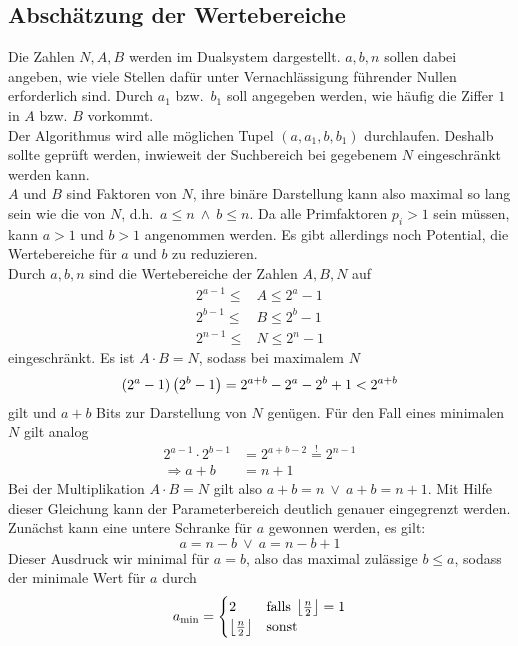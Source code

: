\subsection{Abschätzung der Wertebereiche}\label{sec:parameterspace}
Die Zahlen $N,A,B$ werden im Dualsystem dargestellt. $a,b,n$ sollen dabei angeben, wie viele Stellen dafür unter Vernachlässigung führender Nullen erforderlich sind. Durch $a_1$ bzw.\ $b_1$ soll angegeben werden, wie häufig die Ziffer $1$ in $A$ bzw. $B$ vorkommt. \\
Der Algorithmus wird alle möglichen Tupel $\left(a,a_1,b,b_1\right)$ durchlaufen. Deshalb sollte geprüft werden, inwieweit der Suchbereich bei gegebenem $N$ eingeschränkt werden kann. \\
$A$ und $B$ sind Faktoren von $N$, ihre binäre Darstellung kann also maximal so lang sein wie die von $N$, d.h.\ $a\leq n\:\wedge\: b\leq n$. Da alle Primfaktoren $p_i > 1$ sein müssen, kann $a>1$ und $b>1$ angenommen werden. Es gibt allerdings noch Potential, die Wertebereiche für $a$ und $b$ zu reduzieren. \\
Durch $a,b,n$ sind die Wertebereiche der Zahlen $A,B,N$ auf
\begin{align*}
		2^{a-1}\leq &A \leq 2^a-1 \\
		2^{b-1}\leq &B \leq 2^b-1 \\
		2^{n-1}\leq &N \leq 2^n-1
\end{align*}
eingeschränkt. Es ist $A\cdot B=N$, sodass bei maximalem $N$
\begin{equation*}
		\left(2^a-1\right)\left(2^b-1\right)=2^{a+b}-2^a-2^b+1<2^{a+b} \\
\end{equation*}
gilt und $a+b$ Bits zur Darstellung von $N$ genügen. Für den Fall eines minimalen $N$ gilt analog
\begin{align*}
		2^{a-1}\cdot 2^{b-1}&=2^{a+b-2}\overset{!}{=}2^{n-1} \\
		\Rightarrow a+b&=n+1
\end{align*}
Bei der Multiplikation $A\cdot B =N$ gilt also $a+b=n\:\vee\:a+b=n+1$. Mit Hilfe dieser Gleichung kann der Parameterbereich deutlich genauer eingegrenzt werden. \\
Zunächst kann eine untere Schranke für $a$ gewonnen werden, es gilt:
\begin{equation*}
		a=n-b \:\vee\: a=n-b+1
\end{equation*}
Dieser Ausdruck wir minimal für $a=b$, also das maximal zulässige $b \leq a$, sodass der minimale Wert für $a$ durch
\begin{equation}
		a_\mathrm{\min}=\begin{cases}
						2 & \mathrm{falls}\:\left\lfloor\frac{n}{2}\right\rfloor = 1 \\
						\left\lfloor\frac{n}{2}\right\rfloor & \mathrm{sonst}
		\end{cases}\label{eq:amin}
\end{equation}
